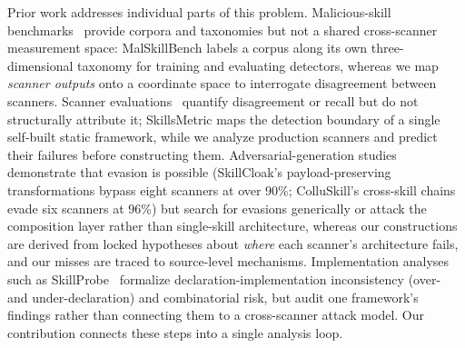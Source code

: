 \documentclass[sigconf,nonacm]{acmart}
\begin{document}
Prior work addresses individual parts of this problem. Malicious-skill benchmarks~\cite{malskillbench2026,skilltrustbench2026} provide corpora and taxonomies but not a shared cross-scanner measurement space: MalSkillBench labels a corpus along its own three-dimensional taxonomy for training and evaluating detectors, whereas we map \emph{scanner outputs} onto a coordinate space to interrogate disagreement between scanners. Scanner evaluations~\cite{clawhub2026,locatejudge2026,skillscan2026,skillsmetric2026} quantify disagreement or recall but do not structurally attribute it; SkillsMetric maps the detection boundary of a single self-built static framework, while we analyze production scanners and predict their failures before constructing them. Adversarial-generation studies~\cite{cloakdetonate2026,colluskill2026} demonstrate that evasion is possible (SkillCloak's payload-preserving transformations bypass eight scanners at over 90\%; ColluSkill's cross-skill chains evade six scanners at 96\%) but search for evasions generically or attack the composition layer rather than single-skill architecture, whereas our constructions are derived from locked hypotheses about \emph{where} each scanner's architecture fails, and our misses are traced to source-level mechanisms. Implementation analyses such as SkillProbe~\cite{skillprobe2026} formalize declaration-implementation inconsistency (over- and under-declaration) and combinatorial risk, but audit one framework's findings rather than connecting them to a cross-scanner attack model. Our contribution connects these steps into a single analysis loop.



\end{document}
